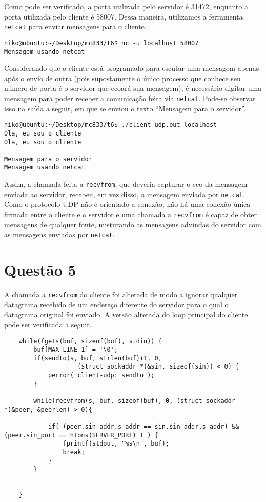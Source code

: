 \documentclass[a4paper,10pt]{article}
\begin{document}
Como pode ser verificado, a porta utilizada pelo servidor é 31472, enquanto a porta utilizada pelo cliente é 58007. Dessa maneira, utilizamos a ferramenta {\tt netcat} para enviar mensagens para o cliente.

\begin{lstlisting}
niko@ubuntu:~/Desktop/mc833/t6$ nc -u localhost 58007
Mensagem usando netcat

\end{lstlisting}

Considerando que o cliente está programado para escutar uma mensagem apenas após o envio de outra (pois supostamente o único processo que conhece seu número de porta é o servidor que ecoará sua mensagem), é necessário digitar uma mensagem para poder receber a comunicação feita via {\tt netcat}. Pode-se observar isso na saída a seguir, em que se enviou o texto ``Mensagem para o servidor''.

\begin{lstlisting}
niko@ubuntu:~/Desktop/mc833/t6$ ./client_udp.out localhost
Ola, eu sou o cliente
Ola, eu sou o cliente

Mensagem para o servidor
Mensagem usando netcat
\end{lstlisting}

Assim, a chamada feita a {\tt recvfrom}, que deveria capturar o eco da mensagem enviada ao servidor, recebeu, em vez disso, a mensagem enviada por {\tt netcat}. Como o protocolo UDP não é orientado a conexão, não há uma conexão única firmada entre o cliente e o servidor e uma chamada a {\tt recvfrom} é capaz de obter mensagens de qualquer fonte, misturando as mensagens advindas do servidor com as mensagens enviadas por {\tt netcat}.

\section{Questão 5}

A chamada a {\tt recvfrom} do cliente foi alterada de modo a ignorar qualquer datagrama recebido de um endereço diferente do servidor para o qual o datagrama original foi enviado. A versão alterada do loop principal do cliente pode ser verificada a seguir.

\begin{lstlisting}
    while(fgets(buf, sizeof(buf), stdin)) {
        buf[MAX_LINE-1] = '\0';
        if(sendto(s, buf, strlen(buf)+1, 0,
                    (struct sockaddr *)&sin, sizeof(sin)) < 0) {
            perror("client-udp: sendto");
        }
        
        while(recvfrom(s, buf, sizeof(buf), 0, (struct sockaddr *)&peer, &peerlen) > 0){

            if( (peer.sin_addr.s_addr == sin.sin_addr.s_addr) && (peer.sin_port == htons(SERVER_PORT) ) ) {
                fprintf(stdout, "%s\n", buf);
                break;
            }
        }

        
    }
\end{lstlisting}
\end{document}
